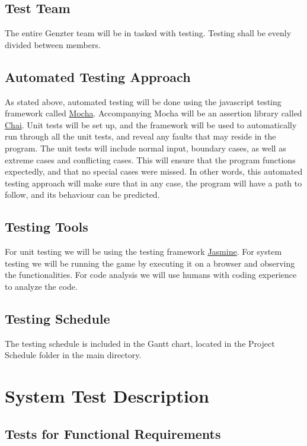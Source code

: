 \documentclass[11pt, oneside]{article}   	%
\begin{document}
\subsection{Test Team}
The entire Genzter team will be in tasked with testing. Testing shall be evenly divided between members.

\subsection{Automated Testing Approach}
As stated above, automated testing will be done using the javascript testing framework called \href{http://mochajs.org}{Mocha}. Accompanying Mocha will be an assertion library called \href{http://chaijs.com/}{Chai}. Unit tests will be set up, and the framework will be used to automatically run through all the unit tests, and reveal any faults that may reside in the program. The unit tests will include normal input, boundary cases, as well as extreme cases and conflicting cases. This will ensure that the program functions expectedly, and that no special cases were missed. In other words, this automated testing approach will make sure that in any case, the program will have a path to follow, and its behaviour can be predicted.

\subsection{Testing Tools}
For unit testing we will be using the testing framework \href{http://jasmine.github.io/}{Jasmine}. For system testing we will be running the game by executing it on a browser and observing the functionalities. For code analysis we will use humans with coding experience to analyze the code.

\subsection{Testing Schedule}
The testing schedule is included in the Gantt chart, located in the Project Schedule folder in the main directory.

\newpage

\section{System Test Description}
\subsection{Tests for Functional Requirements}
\end{document}
